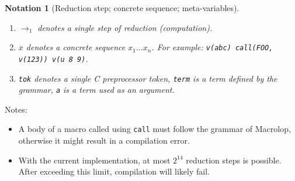 \documentclass[a4paper, 12pt]{article}
\theoremstyle{break}
\newtheorem{notation}{Notation}
\begin{document}
\begin{notation}[Reduction step; concrete sequence; meta-variables]
    \begin{enumerate}
        \item $\to_1$ denotes a single step of reduction (computation).

        \item $\overline{x}$ denotes a concrete sequence $x_1 \ldots x_n$. For example:
        \texttt{v(abc) call(FOO, v(123)) v(u 8 9)}.

        \item \texttt{tok} denotes a single C preprocessor token, \texttt{term} is a term defined
    by the grammar, \texttt{a} is a term used as an argument.
    \end{enumerate}
\end{notation}

Notes:

\begin{itemize}
    \item A body of a macro called using \texttt{call} must follow the grammar of
    Macrolop, otherwise it might result in a compilation error.
    \item With the current implementation, at most $2^{14}$ reduction steps is
    possible. After exceeding this limit, compilation will likely fail.
\end{itemize}

\printbibliography
\end{document}
